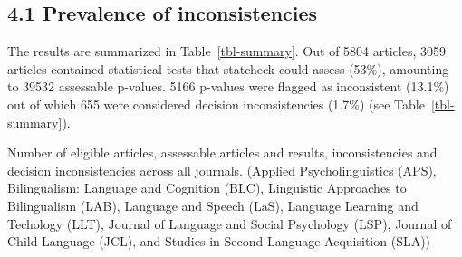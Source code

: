 \documentclass[
  doc,
  longtable,
  nolmodern,
  notxfonts,
  notimes,
  colorlinks=true,linkcolor=blue,citecolor=blue,urlcolor=blue]{apa7}
\begin{document}
\subsection{4.1 Prevalence of
inconsistencies}\label{prevalence-of-inconsistencies}

The results are summarized in Table~\ref{tbl-summary}. Out of 5804
articles, 3059 articles contained statistical tests that statcheck could
assess (53\%), amounting to 39532 assessable p-values. 5166 p-values
were flagged as inconsistent (13.1\%) out of which 655 were considered
decision inconsistencies (1.7\%) (see Table~\ref{tbl-summary}).

\begin{table}

{\caption{{Number of eligible articles, assessable articles and results,
inconsistencies and decision inconsistencies across all journals.
(Applied Psycholinguistics (APS), Bilingualism: Language and Cognition
(BLC), Linguistic Approaches to Bilingualism (LAB), Language and Speech
(LaS), Language Learning and Techology (LLT), Journal of Language and
Social Psychology (LSP), Journal of Child Language (JCL), and Studies in
Second Language Acquisition (SLA))}{\label{tbl-summary}}}}


\end{table}
\end{document}
